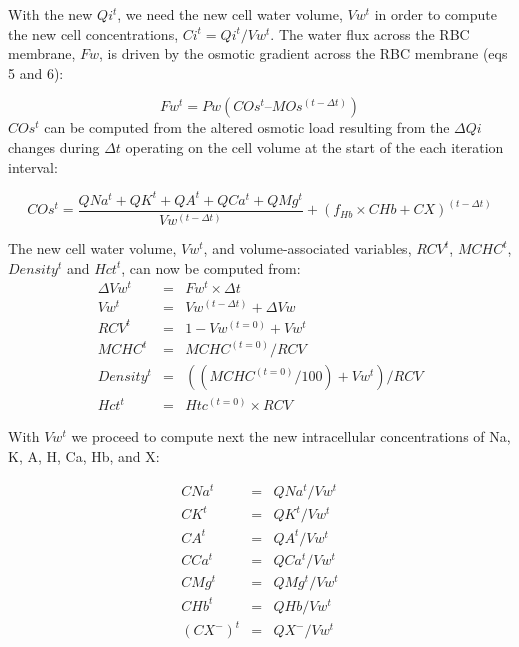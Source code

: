 \documentclass[a4paper]{article}
\newcommand{\med}[1]{M#1}
\newcommand{\cell}[1]{C#1}
\newcommand{\MOs}{\med{Os}}
\newcommand{\CNa}{\cell{Na}}
\newcommand{\CK}{\cell{K}}
\newcommand{\CA}{\cell{A}}
\newcommand{\CHb}{\cell{Hb}}
\newcommand{\COs}{\cell{Os}}
\newcommand{\CCa}{\cell{Ca}}
\newcommand{\CMg}{\cell{Mg}}
\newcommand{\CX}{\cell{X}}
\begin{document}
With the new $Qi^t$, we need the new cell water volume, $Vw^t$ in order to compute the new cell concentrations, $Ci^t = Qi^t/Vw^t$.  The water flux across the RBC membrane, $Fw$, is driven by the osmotic gradient across the RBC membrane (eqs 5 and 6): 
\setcounter{equation}{0}
\renewcommand{\theequation}{22\alph{equation}}

\begin{equation}
Fw^t = Pw(\COs^t – \MOs^{(t-\Delta t)}) 
\end{equation}
$\COs^t$ can be computed from the altered osmotic load resulting from the $\Delta Qi$ changes during $\Delta t$ operating on the cell volume at the start of the each iteration interval: 

\begin{equation}
COs^t = \frac{QNa^t + QK^t + QA^t + QCa^t + QMg^t}{Vw^{(t-\Delta t)}}  + (f_{Hb}\times\CHb + \CX )^{(t-\Delta t)}
\end{equation}


\setcounter{equation}{0}
\renewcommand{\theequation}{23\alph{equation}}

The new cell water volume, $Vw^t$, and volume-associated variables, $RCV^t$, $MCHC^t$, $Density^t$ and $Hct^t$, can now be computed from: 
\begin{eqnarray}
\Delta Vw^t &=& Fw^t\times\Delta t \\
Vw^t &=& Vw^{(t-\Delta t)} + \Delta Vw \\
RCV^t &=& 1-Vw^{(t=0)} + Vw^t  \\
MCHC^t &=& MCHC^{(t=0)}/RCV  \\
Density^t &=& ((MCHC^{(t=0)}/100) + Vw^t)/RCV  \\
Hct^t &=& Htc^{(t=0)}\times RCV  
\end{eqnarray}

With $Vw^t$ we proceed to compute next the new intracellular concentrations of Na, K, A, H, Ca, Hb, and X:

\setcounter{equation}{0}
\renewcommand{\theequation}{24\alph{equation}}

\begin{eqnarray}
\CNa^t &=& QNa^t/Vw^t \\
\CK^t &=& QK^t/Vw^t \\
\CA^t &=& QA^t/Vw^t  \\
\CCa^t &=& QCa^t/Vw^t  \\
\CMg^t &=& QMg^t/Vw^t  \\
\CHb^t &=& QHb/Vw^t \\
(\CX^{-})^t &=& QX^{-} /Vw^t  
\end{eqnarray}
\end{document}

